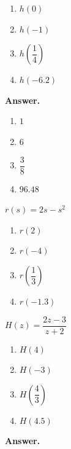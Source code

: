 \documentclass[10pt,]{book}
\theoremstyle{plain}
\theoremstyle{definition}
\theoremstyle{definition}
\theoremstyle{definition}
\begin{document}
\begin{exerciselist}
\begin{exercisegroup}
\begin{multicols}{2}
\begin{enumerate}[label=\alph*]
\item\hypertarget{li-159}{}\(h(0)\)%
\item\hypertarget{li-160}{}\(h(-1)\)%
\item\hypertarget{li-161}{}\(h\left(\dfrac{1}{4}\right)\)%
\item\hypertarget{li-162}{}\(h(-6.2)\)%
\end{enumerate}
\end{multicols}
%
\par\smallskip
\noindent\textbf{Answer.}\hypertarget{answer-32}{}\quad
\leavevmode%
\begin{multicols}{2}
\begin{enumerate}[label=\alph*]
\item\hypertarget{li-163}{}\(1\)%
\item\hypertarget{li-164}{}\(6\)%
\item\hypertarget{li-165}{}\(\dfrac{3}{8}\)%
\item\hypertarget{li-166}{}\(96.48 \)%
\end{enumerate}
\end{multicols}
%
\exercise[44.]\hypertarget{exercise-54}{}\(r (s) = 2s - s^2\) \leavevmode%
\begin{multicols}{2}
\begin{enumerate}[label=\alph*]
\item\hypertarget{li-167}{}\(r(2)\)%
\item\hypertarget{li-168}{}\(r(-4)\)%
\item\hypertarget{li-169}{}\(r\left(\dfrac{1}{3}\right)\)%
\item\hypertarget{li-170}{}\(r(-1.3)\)%
\end{enumerate}
\end{multicols}
%
\exercise[45.]\hypertarget{exercise-55}{}\(H(z) = \dfrac{2z - 3}{z + 2}\) \leavevmode%
\begin{multicols}{2}
\begin{enumerate}[label=\alph*]
\item\hypertarget{li-171}{}\(H(4)\)%
\item\hypertarget{li-172}{}\(H(-3)\)%
\item\hypertarget{li-173}{}\(H\left(\dfrac{4}{3}\right)\)%
\item\hypertarget{li-174}{}\(H(4.5)\)%
\end{enumerate}
\end{multicols}
%
\par\smallskip
\noindent\textbf{Answer.}\hypertarget{answer-33}{}\quad

\end{exercisegroup}
\end{exerciselist}
\end{document}
